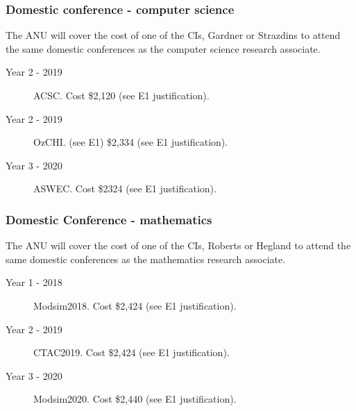 \documentclass[a4paper,twoside,12pt,compact]{article}
\begin{document}
\subsubsection*{Domestic conference - computer science}

The ANU will cover the cost of one of the CIs, Gardner or Strazdins 
to attend the  same domestic conferences as the computer science 
research associate. 


\begin{description}
\item[Year 2 - 2019] ACSC. Cost \$2,120  (see E1 justification).

\item[Year 2 - 2019] OzCHI. (see E1) \$2,334 (see E1 justification).

\item[Year 3 -  2020] ASWEC.  Cost \$2324 (see E1 justification).

\end{description}

\subsubsection*{Domestic Conference - mathematics}

The ANU will cover the cost of one of the CIs, Roberts or Hegland 
to attend the  same domestic conferences as the mathematics 
research associate. 


\begin{description}
\item[Year 1 - 2018] Modsim2018. Cost \$2,424  (see E1 justification).

\item[Year 2 - 2019] CTAC2019. Cost \$2,424  (see E1 justification).

\item[Year 3 - 2020] Modsim2020.  Cost \$2,440  (see E1 justification).


\end{description}
\end{document}
